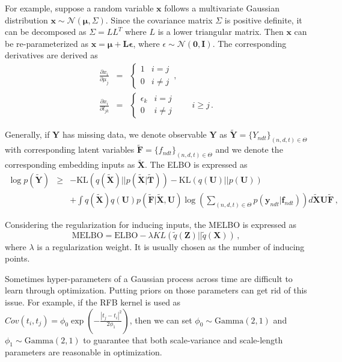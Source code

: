 \documentclass{article}
\begin{document}
For example, suppose a random variable $\bm x$ follows a multivariate Gaussian distribution $\bm x \sim \mathcal{N}(\bm{\mu}, \Sigma)$. Since the covariance matrix $\Sigma$ is positive definite, it can be decomposed as $\Sigma = LL^T$ where $L$ is a lower triangular matrix. Then $\bm x$ can be re-parameterized as $\bm x = \bm \mu + \bm L\bm \epsilon$, where $\epsilon \sim \mathcal{N}(\bm 0, \bm I)$. The corresponding derivatives are derived as 
\begin{eqnarray}
\frac{\partial x_i}{\partial \mu_j} & = & \begin{cases}
1 & i = j \\
0 & i \neq j
\end{cases} \,, \nonumber \\
\frac{\partial x_i}{\partial l_{jk}} & = & \begin{cases}
\epsilon_k & i = j \\
0 & i \neq j
\end{cases} \qquad i \geq j\,.
\end{eqnarray}

Generally, if $\bm Y$ has missing data, we denote observable $\bm Y$ as $\tilde{\bm Y} = \{Y_{ndt}\}_{(n,d,t)\in\Theta}$ with corresponding latent variables $\tilde{\bm F} = \{f_{ndt}\}_{(n,d,t)\in\Theta}$ and we denote the corresponding embedding inputs as $\tilde{\bm X}$. The ELBO is expressed as  
\begin{eqnarray}
\log p(\tilde{\bm Y}) & \geq & -\mathrm{KL}(q(\tilde{\bm X}) || p(\tilde{\bm X} | \tilde{\bm T})) - \mathrm{KL}(q(\bm U) || p(\bm U)) \\ 
& & +  \int q(\tilde{\bm X}) q(\bm  U) p(\tilde{\bm F} | \tilde{\bm X}, \bm U) \log\left(\sum_{(n,d,t)\in\Theta} p(\bm y_{ndt} | \bm f_{ndt})\right)d\tilde{\bm X} \bm U \tilde{\bm F}\,, \nonumber
\end{eqnarray}

Considering the regularization for inducing inputs, the MELBO is expressed as
\begin{equation}
\mathrm{MELBO} = \mathrm{ELBO} - \lambda KL(\tilde{q}(\bm Z)|| \tilde{q}(\bm X))\,,
\end{equation}
where $\lambda$ is a regularization weight. It is usually chosen as the number of inducing points.

Sometimes hyper-parameters of a Gaussian process across time are difficult to learn through optimization. Putting priors on those parameters can get rid of this issue. For example, if the RFB kernel is used as $Cov(t_i, t_j) = \phi_0\exp(-\frac{|t_j - t_i|^2}{2\phi_1})$, then we can set $\phi_0 \sim \mathrm{Gamma}(2,1)$ and $\phi_1 \sim \mathrm{Gamma}(2,1)$ to guarantee that both scale-variance and scale-length parameters are reasonable in optimization.
\end{document}
